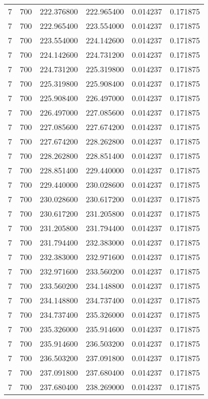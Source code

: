 \begin{longtable}{rrrrrr}
7 & 700 & 222.376800 & 222.965400 & 0.014237 & 0.171875 \\
7 & 700 & 222.965400 & 223.554000 & 0.014237 & 0.171875 \\
7 & 700 & 223.554000 & 224.142600 & 0.014237 & 0.171875 \\
7 & 700 & 224.142600 & 224.731200 & 0.014237 & 0.171875 \\
7 & 700 & 224.731200 & 225.319800 & 0.014237 & 0.171875 \\
7 & 700 & 225.319800 & 225.908400 & 0.014237 & 0.171875 \\
7 & 700 & 225.908400 & 226.497000 & 0.014237 & 0.171875 \\
7 & 700 & 226.497000 & 227.085600 & 0.014237 & 0.171875 \\
7 & 700 & 227.085600 & 227.674200 & 0.014237 & 0.171875 \\
7 & 700 & 227.674200 & 228.262800 & 0.014237 & 0.171875 \\
7 & 700 & 228.262800 & 228.851400 & 0.014237 & 0.171875 \\
7 & 700 & 228.851400 & 229.440000 & 0.014237 & 0.171875 \\
7 & 700 & 229.440000 & 230.028600 & 0.014237 & 0.171875 \\
7 & 700 & 230.028600 & 230.617200 & 0.014237 & 0.171875 \\
7 & 700 & 230.617200 & 231.205800 & 0.014237 & 0.171875 \\
7 & 700 & 231.205800 & 231.794400 & 0.014237 & 0.171875 \\
7 & 700 & 231.794400 & 232.383000 & 0.014237 & 0.171875 \\
7 & 700 & 232.383000 & 232.971600 & 0.014237 & 0.171875 \\
7 & 700 & 232.971600 & 233.560200 & 0.014237 & 0.171875 \\
7 & 700 & 233.560200 & 234.148800 & 0.014237 & 0.171875 \\
7 & 700 & 234.148800 & 234.737400 & 0.014237 & 0.171875 \\
7 & 700 & 234.737400 & 235.326000 & 0.014237 & 0.171875 \\
7 & 700 & 235.326000 & 235.914600 & 0.014237 & 0.171875 \\
7 & 700 & 235.914600 & 236.503200 & 0.014237 & 0.171875 \\
7 & 700 & 236.503200 & 237.091800 & 0.014237 & 0.171875 \\
7 & 700 & 237.091800 & 237.680400 & 0.014237 & 0.171875 \\
7 & 700 & 237.680400 & 238.269000 & 0.014237 & 0.171875 \\

\end{longtable}
